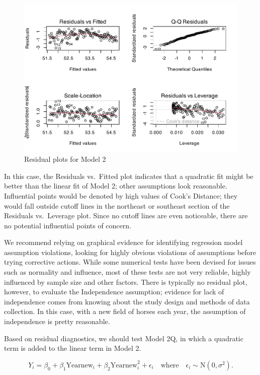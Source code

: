\documentclass[
]{krantz}
\begin{document}
\begin{figure}

{\centering \includegraphics[width=0.9\linewidth]{bookdown-BeyondMLR_files/figure-latex/resid2-1} 

}

\caption{Residual plots for Model 2}\label{fig:resid2}
\end{figure}

In this case, the Residuals vs.~Fitted plot indicates that a quadratic fit might be better than the linear fit of Model 2; other assumptions look reasonable. Influential points would be denoted by high values of Cook's Distance; they would fall outside cutoff lines in the northeast or southeast section of the Residuals vs.~Leverage plot. Since no cutoff lines are even noticeable, there are no potential influential points of concern.

We recommend relying on graphical evidence for identifying regression model assumption violations, looking for highly obvious violations of assumptions before trying corrective actions. While some numerical tests have been devised for issues such as normality and influence, most of these tests are not very reliable, highly influenced by sample size and other factors. There is typically no residual plot, however, to evaluate the Independence assumption; evidence for lack of independence comes from knowing about the study design and methods of data collection. In this case, with a new field of horses each year, the assumption of independence is pretty reasonable.

Based on residual diagnostics, we should test Model 2Q, in which a quadratic term is added to the linear term in Model 2.

\begin{equation*}
Y_{i}=\beta_{0}+\beta_{1}\textrm{Yearnew}_{i}+\beta_{2}\textrm{Yearnew}^2_{i}+\epsilon_{i}\quad \textrm{where}\quad \epsilon_{i}\sim \textrm{N}(0,\sigma^2).
\end{equation*}
\end{document}
